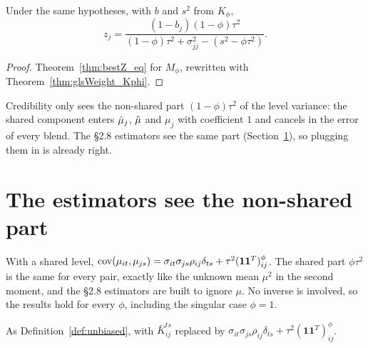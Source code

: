 \begin{theorem}\label{thm:bestZ_phi_eq}
  \leanok
  Under the same hypotheses, with $b$ and $s^2$ from $K_\phi$,
  \[
    z_j = \frac{(1-b_j)(1-\phi)\tau^2}{(1-\phi)\tau^2 + \sigma^2_{jj} - (s^2 - \phi\tau^2)}.
  \]
\end{theorem}
\begin{proof}
  \leanok
  Theorem~\ref{thm:bestZ_eq} for $M_\phi$, rewritten with
  Theorem~\ref{thm:glsWeight_Kphi}.
\end{proof}

\begin{remark}[Reading]\label{rem:hier_reading}
  Credibility only sees the non-shared part $(1-\phi)\tau^2$ of the level
  variance: the shared component enters $\hat\mu_j$, $\hat\mu$ and $\mu_j$ with
  coefficient $1$ and cancels in the error of every blend. The §2.8 estimators
  see the same part (Section~\ref{sec:hier_bridge3}), so plugging them in is
  already right.
\end{remark}

\section{The estimators see the non-shared part}\label{sec:hier_bridge3}

With a shared level, $\operatorname{cov}(\mu_{it},\mu_{js}) =
\sigma_{it}\sigma_{js}\rho_{ij}\delta_{ts} + \tau^2(\mathbf 1\mathbf 1^T)^\phi_{ij}$.
The shared part $\phi\tau^2$ is the same for every pair, exactly like the
unknown mean $\mu^2$ in the second moment, and the §2.8 estimators are built
to ignore $\mu$. No inverse is involved, so the results hold for every $\phi$,
including the singular case $\phi = 1$.

\begin{definition}\label{def:Ephi}
  \leanok
  As Definition~\ref{def:unbiased}, with $\bar K^{ts}_{ij}$ replaced by
  $\sigma_{it}\sigma_{js}\rho_{ij}\delta_{ts} + \tau^2(\mathbf 1\mathbf 1^T)^\phi_{ij}$.
\end{definition}

